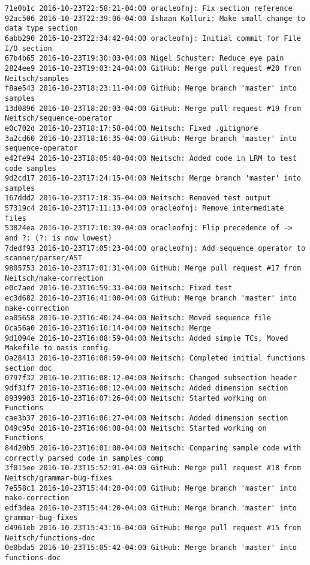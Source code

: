 \begin{lstlisting}
71e0b1c 2016-10-23T22:58:21-04:00 oracleofnj: Fix section reference
92ac506 2016-10-23T22:39:06-04:00 Ishaan Kolluri: Make small change to data type section
6abb290 2016-10-23T22:34:42-04:00 oracleofnj: Initial commit for File I/O section
67b4b65 2016-10-23T19:30:03-04:00 Nigel Schuster: Reduce eye pain
2824ee9 2016-10-23T19:03:24-04:00 GitHub: Merge pull request #20 from Neitsch/samples
f8ae543 2016-10-23T18:23:11-04:00 GitHub: Merge branch 'master' into samples
13d0896 2016-10-23T18:20:03-04:00 GitHub: Merge pull request #19 from Neitsch/sequence-operator
e0c702d 2016-10-23T18:17:58-04:00 Neitsch: Fixed .gitignore
3a2cd60 2016-10-23T18:16:35-04:00 GitHub: Merge branch 'master' into sequence-operator
e42fe94 2016-10-23T18:05:48-04:00 Neitsch: Added code in LRM to test code samples
9d2cd17 2016-10-23T17:24:15-04:00 Neitsch: Merge branch 'master' into samples
167ddd2 2016-10-23T17:18:35-04:00 Neitsch: Removed test output
57319c4 2016-10-23T17:11:13-04:00 oracleofnj: Remove intermediate files
53824ea 2016-10-23T17:10:39-04:00 oracleofnj: Flip precedence of -> and ?: (?: is now lowest)
7dedf93 2016-10-23T17:05:23-04:00 oracleofnj: Add sequence operator to scanner/parser/AST
9805753 2016-10-23T17:01:31-04:00 GitHub: Merge pull request #17 from Neitsch/make-correction
e0c7aed 2016-10-23T16:59:33-04:00 Neitsch: Fixed test
ec3d682 2016-10-23T16:41:00-04:00 GitHub: Merge branch 'master' into make-correction
ea05658 2016-10-23T16:40:24-04:00 Neitsch: Moved sequence file
0ca56a0 2016-10-23T16:10:14-04:00 Neitsch: Merge
9d1094e 2016-10-23T16:08:59-04:00 Neitsch: Added simple TCs, Moved Makefile to oasis config
0a28413 2016-10-23T16:08:59-04:00 Neitsch: Completed initial functions section doc
0797f32 2016-10-23T16:08:12-04:00 Neitsch: Changed subsection header
9df31f7 2016-10-23T16:08:12-04:00 Neitsch: Added dimension section
8939903 2016-10-23T16:07:26-04:00 Neitsch: Started working on Functions
cae3b37 2016-10-23T16:06:27-04:00 Neitsch: Added dimension section
049c95d 2016-10-23T16:06:08-04:00 Neitsch: Started working on Functions
84d20b5 2016-10-23T16:01:00-04:00 Neitsch: Comparing sample code with correctly parsed code in samples_comp
3f015ee 2016-10-23T15:52:01-04:00 GitHub: Merge pull request #18 from Neitsch/grammar-bug-fixes
7e558c1 2016-10-23T15:44:20-04:00 GitHub: Merge branch 'master' into make-correction
edf3dea 2016-10-23T15:44:20-04:00 GitHub: Merge branch 'master' into grammar-bug-fixes
d4961eb 2016-10-23T15:43:16-04:00 GitHub: Merge pull request #15 from Neitsch/functions-doc
0e0bda5 2016-10-23T15:05:42-04:00 GitHub: Merge branch 'master' into functions-doc

\end{lstlisting}
